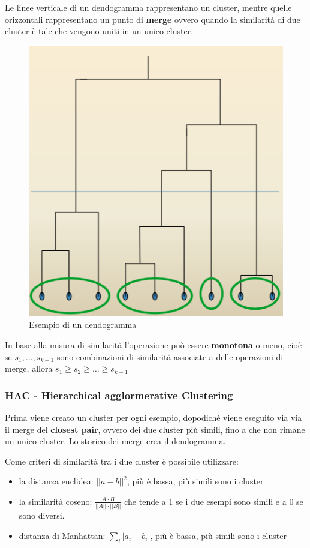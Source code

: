 Le linee verticale di un dendogramma rappresentano un cluster, mentre
quelle orizzontali rappresentano un punto di \textbf{merge} ovvero
quando la similarità di due cluster è tale che vengono uniti in un unico
cluster.

\begin{figure}[htbp]
\centering
\includegraphics[width=.5\textwidth]{./notes/immagini/l17-clustering.png}
\caption{Esempio di un dendogramma}
\end{figure}

In base alla misura di similarità l'operazione può essere
\textbf{monotona} o meno, cioè se $s_1, \ldots, s_{k-1}$ sono
combinazioni di similarità associate a delle operazioni di merge, allora
$s_1 \geq s_2 \geq \ldots \geq s_{k-1}$

\subsubsection{HAC - Hierarchical agglormerative
Clustering}\label{hac---hierarchical-agglormerative-clustering}

Prima viene creato un cluster per ogni esempio, dopodiché viene eseguito
via via il merge del \textbf{closest pair}, ovvero dei due cluster più
simili, fino a che non rimane un unico cluster. Lo storico dei merge
crea il dendogramma.

Come criteri di similarità tra i due cluster è possibile utilizzare:

\begin{itemize}
	\item la distanza euclidea: $||a-b||^2$, più è bassa, più simili sono i cluster
	\item la similarità coseno: $\frac{A \cdot B}{||A|| \cdot ||B||}$ che tende a 1 se i due esempi sono simili e a 0 se sono diversi.
	\item distanza di Manhattan: $\sum_i|a_i - b_i|$, più è bassa, più simili sono i cluster
\end{itemize}

